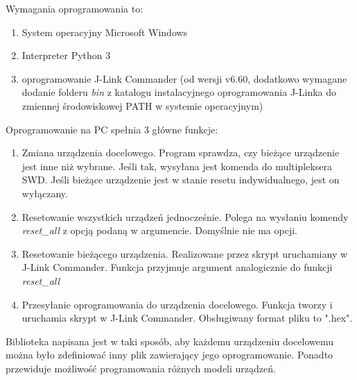 Wymagania oprogramowania to:
\begin{enumerate}
    \item System operacyjny Microsoft Windows
    \item Interpreter Python 3
    \item oprogramowanie J-Link Commander (od wersji v6.60, dodatkowo wymagane dodanie folderu  \emph{bin} z katalogu instalacyjnego oprogramowania J-Linka do zmiennej środowiskowej PATH w systemie operacyjnym)
\end{enumerate}


Oprogramowanie na PC spełnia 3  główne funkcje:
\begin{enumerate}
    \item Zmiana urządzenia docelowego. Program sprawdza, czy bieżące urządzenie jest inne niż wybrane. Jeśli tak, wysyłana jest komenda do multipleksera SWD. Jeśli bieżące urządzenie jest w stanie resetu indywidualnego, jest on wyłączany.
    \item Resetowanie wszystkich urządzeń jednocześnie. Polega na wysłaniu komendy \emph{reset\_all} z opcją podaną w argumencie. Domyślnie nie ma opcji.
    \item Resetowanie bieżącego urządzenia. Realizowane przez skrypt uruchamiany w J-Link Commander. Funkcja przyjmuje argument analogicznie do funkcji \emph{reset\_all}
    \item Przesyłanie oprogramowania do urządzenia docelowego. Funkcja tworzy i uruchamia skrypt w J-Link Commander. Obsługiwany format pliku to ".hex".
\end{enumerate}

Biblioteka napisana jest w taki sposób, aby każdemu urządzeniu docelowemu można było zdefiniować inny plik zawierający jego oprogramowanie. Ponadto przewiduje możliwość programowania różnych modeli urządzeń. 



